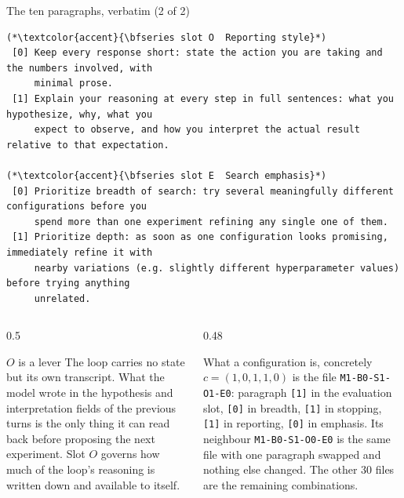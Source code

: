 \documentclass[aspectratio=169,11pt]{beamer}
\begin{document}
\begin{frame}[fragile]{The ten paragraphs, verbatim (2 of 2)}
\begin{lstlisting}[style=para]
(*\textcolor{accent}{\bfseries slot O  Reporting style}*)
 [0] Keep every response short: state the action you are taking and the numbers involved, with
     minimal prose.
 [1] Explain your reasoning at every step in full sentences: what you hypothesize, why, what you
     expect to observe, and how you interpret the actual result relative to that expectation.

(*\textcolor{accent}{\bfseries slot E  Search emphasis}*)
 [0] Prioritize breadth of search: try several meaningfully different configurations before you
     spend more than one experiment refining any single one of them.
 [1] Prioritize depth: as soon as one configuration looks promising, immediately refine it with
     nearby variations (e.g. slightly different hyperparameter values) before trying anything
     unrelated.
\end{lstlisting}
  \vfill
  \begin{columns}[T]
    \begin{column}{0.5\textwidth}
      \begin{alertblock}{$O$ is a lever}
        \scriptsize
        The loop carries no state but its own transcript. What the model wrote
        in the hypothesis and interpretation fields of the previous turns is
        the only thing it can read back before proposing the next experiment.
        Slot $O$ governs how much of the loop's reasoning is written
        down and available to itself.
      \end{alertblock}
    \end{column}
    \begin{column}{0.48\textwidth}
      \begin{block}{What a configuration is, concretely}
        \scriptsize
        $c = (1,0,1,1,0)$ is the file \texttt{M1-B0-S1-O1-E0}: paragraph
        \texttt{[1]} in the evaluation slot, \texttt{[0]} in breadth,
        \texttt{[1]} in stopping, \texttt{[1]} in reporting, \texttt{[0]} in
        emphasis. Its neighbour \texttt{M1-B0-S1-O0-E0} is the same file with
        one paragraph swapped and nothing else changed. The other 30 files are
        the remaining combinations.
      \end{block}
    \end{column}
  \end{columns}
\end{frame}
\end{document}
